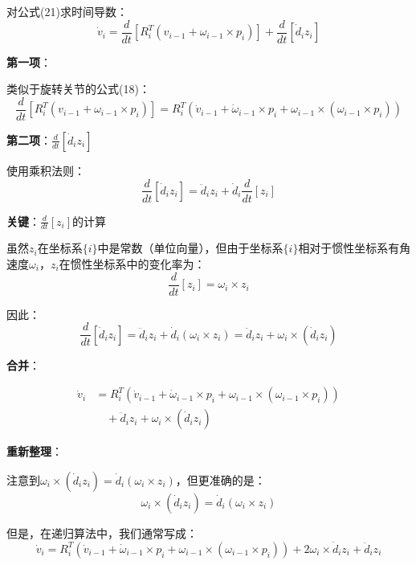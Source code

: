 \documentclass[12pt,a4paper]{article}
\begin{document}
对公式(21)求时间导数：
\begin{equation}
\dot{v}_i = \frac{d}{dt}[R_i^T (v_{i-1} + \omega_{i-1} \times p_i)] + \frac{d}{dt}[\dot{d}_i z_i]
\end{equation}

\textbf{第一项}：

类似于旋转关节的公式(18)：
\begin{equation}
\frac{d}{dt}[R_i^T (v_{i-1} + \omega_{i-1} \times p_i)] = R_i^T (\dot{v}_{i-1} + \dot{\omega}_{i-1} \times p_i + \omega_{i-1} \times (\omega_{i-1} \times p_i))
\end{equation}

\textbf{第二项}：$\frac{d}{dt}[\dot{d}_i z_i]$

使用乘积法则：
\begin{equation}
\frac{d}{dt}[\dot{d}_i z_i] = \ddot{d}_i z_i + \dot{d}_i \frac{d}{dt}[z_i]
\end{equation}

\textbf{关键}：$\frac{d}{dt}[z_i]$的计算

虽然$z_i$在坐标系$\{i\}$中是常数（单位向量），但由于坐标系$\{i\}$相对于惯性坐标系有角速度$\omega_i$，$z_i$在惯性坐标系中的变化率为：
\begin{equation}
\frac{d}{dt}[z_i] = \omega_i \times z_i
\end{equation}

因此：
\begin{equation}
\frac{d}{dt}[\dot{d}_i z_i] = \ddot{d}_i z_i + \dot{d}_i (\omega_i \times z_i) = \ddot{d}_i z_i + \omega_i \times (\dot{d}_i z_i)
\end{equation}

\textbf{合并}：

\begin{align}
\dot{v}_i &= R_i^T (\dot{v}_{i-1} + \dot{\omega}_{i-1} \times p_i + \omega_{i-1} \times (\omega_{i-1} \times p_i)) \\
&\quad + \ddot{d}_i z_i + \omega_i \times (\dot{d}_i z_i)
\end{align}

\textbf{重新整理}：

注意到$\omega_i \times (\dot{d}_i z_i) = \dot{d}_i (\omega_i \times z_i)$，但更准确的是：
\begin{equation}
\omega_i \times (\dot{d}_i z_i) = \dot{d}_i (\omega_i \times z_i)
\end{equation}

但是，在递归算法中，我们通常写成：
\begin{equation}
\dot{v}_i = R_i^T (\dot{v}_{i-1} + \dot{\omega}_{i-1} \times p_i + \omega_{i-1} \times (\omega_{i-1} \times p_i)) + 2\omega_i \times \dot{d}_i z_i + \ddot{d}_i z_i \tag{22}
\end{equation}
\end{document}
